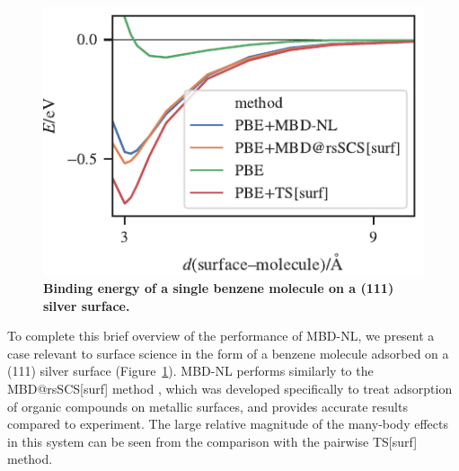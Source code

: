 \begin{figure}[t!]
\centering
\includegraphics{../media/surface.pdf}
\caption{\textbf{Binding energy of a single benzene molecule on a (111) silver surface.}
}\label{fig:silver-benzene}
\end{figure}

To complete this brief overview of the performance of MBD-NL, we present a case relevant to surface science in the form of a benzene molecule adsorbed on a (111) silver surface (Figure~\ref{fig:silver-benzene}).
MBD-NL performs similarly to the MBD@rsSCS[surf] method \citep{RuizPRB16}, which was developed specifically to treat adsorption of organic compounds on metallic surfaces, and provides accurate results compared to experiment.
The large relative magnitude of the many-body effects in this system can be seen from the comparison with the pairwise TS[surf] method.



